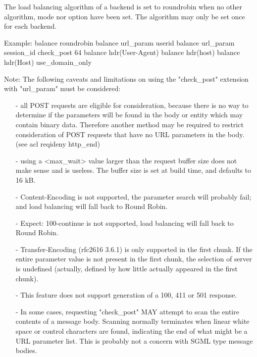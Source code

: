   The load balancing algorithm of a backend is set to roundrobin when no other
  algorithm, mode nor option have been set. The algorithm may only be set once
  for each backend.

  \begin{example}{Example:}
        balance roundrobin
        balance url_param userid
        balance url_param session_id check_post 64
        balance hdr(User-Agent)
        balance hdr(host)
        balance hdr(Host) use_domain_only
  \end{example}

  \begin{note}{Note:}
  The following caveats and limitations on using the "check\_post"
  extension with "url\_param" must be considered:
  
  \begin{itemize}
  \item[-] all POST requests are eligible for consideration, because there is no way
      to determine if the parameters will be found in the body or entity which
      may contain binary data. Therefore another method may be required to
      restrict consideration of POST requests that have no URL parameters in
      the body. (see acl reqideny http\_end)

  \item[-] using a <max\_wait> value larger than the request buffer size does not
      make sense and is useless. The buffer size is set at build time, and
      defaults to 16 kB.

  \item[-] Content-Encoding is not supported, the parameter search will probably
      fail; and load balancing will fall back to Round Robin.

  \item[-] Expect: 100-continue is not supported, load balancing will fall back to
      Round Robin.

  \item[-] Transfer-Encoding (rfc{2616} 3.6.1) is only supported in the first chunk.
      If the entire parameter value is not present in the first chunk, the
      selection of server is undefined (actually, defined by how little
      actually appeared in the first chunk).

  \item[-] This feature does not support generation of a 100, 411 or 501 response.

  \item[-] In some cases, requesting "check\_post" MAY attempt to scan the entire
      contents of a message body. Scanning normally terminates when linear
      white space or control characters are found, indicating the end of what
      might be a URL parameter list. This is probably not a concern with SGML
      type message bodies.
  \end{itemize}
  \end{note}

